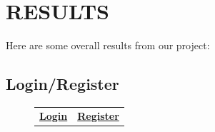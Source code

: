 
\newpage
\vspace{6cm}
\section{RESULTS}
\hspace{0.7cm} Here are some overall results from our project:

\subsection{Login/Register}
\vspace{0.5cm}

\begin{figure}[h]
\centering
    \begin{tabular}{c c}
        \textbf{\underline{Login}} & \textbf{\underline{Register}} \\

\end{tabular}
\end{figure}
